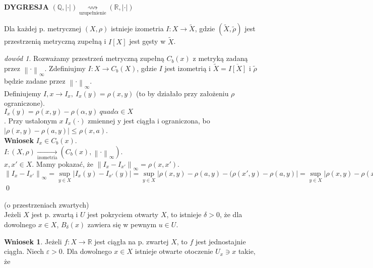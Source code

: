 \documentclass[twoside,10pt]{article}
\newcommand{\norm}[1]{\left\lVert#1\right\rVert}
\theoremstyle{definition}
\theoremstyle{definition}
\theoremstyle{definition}
\theoremstyle{definition}
\theoremstyle{remark}
\newtheorem*{dd}{dowód}
\theoremstyle{definition}
\theoremstyle{definition}
\newtheorem*{wn}{Wniosek}
\theoremstyle{definition}
\theoremstyle{definition}
\theoremstyle{definition}
\theoremstyle{definition}
\begin{document}
\textbf{DYGRESJA} $(\mathbb{Q},| \cdot |) \underset{\text{uzupełnienie}}{\rightsquigarrow}(\mathbb{R},| \cdot |)$
\begin{tw} Dla każdej p. metrycznej $(X,\rho)$ istnieje izometria $I: X \rightarrow \widetilde{X}$, gdzie
    $(\widetilde{X},\widetilde{\rho})$ jest przestrzenią metryczną zupełną i $I[X]$ jest gęsty w $\widetilde{X}$.
\end{tw} 
\begin{dd} Rozważamy przestrzeń metryczną zupełną $C_b(x)$ z metryką zadaną przez $\norm{\cdot}_\infty$. 
    Zdefiniujmy $I: X \rightarrow C_b(X)$, gdzie $I$ jest izometrią i $\widetilde{X} = \overline{I[X]}$ 
    i $\widetilde{\rho}$ będzie zadane przez $\norm{\cdot}_\infty$. \\ 
    Definiujemy $I, x \rightarrow I_x, \ I_x(y) = \rho(x,y)$ (to by działało przy założeniu $\rho$ ograniczone). \\
    $I_x(y) = \rho(x,y) - \rho(\alpha,y) \ quad \alpha \in X$ \\. 
    Przy ustalonym $x \ I_x(\cdot)$ zmiennej y jest ciągła i ograniczona, bo $|\rho(x,y)-\rho(a,y)| \le \rho(x,a)$. \\
    \textbf{Wniosek} $I_x \in C_b(x)$. \\ 
    $I : (X,\rho) \underset{\text{izometria}}{\to} (C_b(x),\norm{\cdot}_\infty) $. \\ 
    $x,x' \in X$. Mamy pokazać, że $\norm{I_x - I_{x'}}_\infty = \rho(x,x')$. \\ 
    $\norm{I_x - I_{x'}}_\infty = \sup\limits_{y \in X}|I_x(y) - I_{x'}(y)|=\sup\limits_{y \in X}
    |\rho(x,y)-\rho(a,y)-(\rho(x',y)-\rho(a,y)| = \sup\limits_{y\in X}|\rho(x,y)-\rho(x',y)| = \rho(x,x')$
    \hfill \qed
\end{dd} 
\begin{ft} (o przestrzeniach zwartych) \\
Jeżeli $X$ jest p. zwartą i $U$ jest pokryciem otwarty $X$, to istnieje $\delta > 0$, że dla 
dowolnego $x \in X$, $B_\delta(x)$ zawiera się w pewnym $u \in U$.
\end{ft} 
\begin{wn} Jeżeli $f: X \to \mathbb{R}$ jest ciągła na p. zwartej $X$, to 
    $f$ jest jednostajnie ciągła. Niech $\varepsilon > 0$. Dla dowolnego $x \in X$ istnieje otwarte otoczenie 
    $U_x \ni x$ takie, że
\end{wn}
\end{document}

